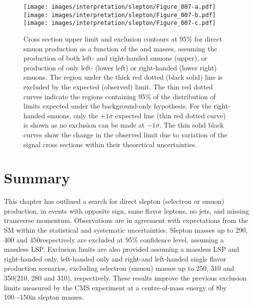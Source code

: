  \begin{figure}[htbp]
\centering
\texttt{[image: images/interpretation/slepton/Figure\_007-a.pdf]} \\
\texttt{[image: images/interpretation/slepton/Figure\_007-b.pdf]}
\texttt{[image: images/interpretation/slepton/Figure\_007-c.pdf]}
\caption{\label{fig:TOTmm}
Cross section upper limit and exclusion contours at 95\% \CL for direct smuon production
as a function of the \lsp and \slep masses, assuming the production of both left- and right-handed smuons
(upper), or production of only left- (lower left) or right-handed (lower right) smuons.
The region under the thick red dotted (black solid) line is excluded by the expected (observed) limit.
The thin red dotted curves indicate the regions containing 95\% of the distribution of limits
expected under the background-only hypothesis. For the right-handed smuons, only the $+1\sigma$ expected line (thin red dotted curve) is shown as no exclusion can be made at $-1\sigma$.
The thin solid black curves show the change in the observed limit due to
variation of the signal cross sections within their theoretical uncertainties.
}
\end{figure}
\section{Summary}
\noindent
\justify
This chapter has outlined a search for direct slepton (selectron or smuon) production, in events with opposite sign, same flavor leptons, no jets, and missing transverse momentum.
Observations are in agreement with expectations from the SM within the statistical and systematic uncertainties.
Slepton masses up to 290, 400 and 450\GeV respectively are excluded at 95\% confidence level, assuming a massless LSP. 
Exclusion limits are also provided assuming a massless LSP and right-handed only, left-handed only and right-and left-handed single flavor production scenarios, excluding selectron (smuon) masses up to 250, 310 and 350\GeV (210, 280 and 310\GeV), respectively.
These results improve the previous exclusion limits measured by the CMS experiment at a centre-of-mass energy of 8\TeV by 100–-150\GeV in slepton masses.
